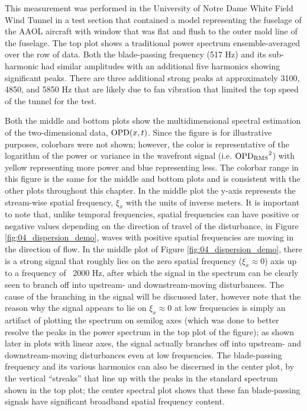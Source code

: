 This measurement was performed in the University of Notre Dame White Field Wind Tunnel in a test section that contained a model representing the fuselage of the AAOL aircraft \cite{Jumper-2013-8KtN3pue} with window that was flat and flush to the outer mold line of the fuselage.
The top plot shows a traditional power spectrum ensemble-averaged over the row of data.
Both the blade-passing frequency (517 Hz) and its sub-harmonic had similar amplitudes  with an additional five harmonics showing significant peaks.
There are three additional strong peaks at approximately 3100, 4850, and 5850 Hz that are likely due to fan vibration that limited the top speed of the tunnel for the test.

Both the middle and bottom plots show the multidimensional spectral estimation of the two-dimensional data, $\operatorname{OPD}(x,t)$.
Since the figure is for illustrative purposes, colorbars were not shown; however, the color is representative of the logarithm of the power or variance in the wavefront signal (i.e. $\operatorname{OPD_{RMS}}^2$) with yellow representing more power and blue representing less.
The colorbar range in this figure is the same for the middle and bottom plots and is consistent with the other plots throughout this chapter.
In the middle plot the y-axis represents the stream-wise spatial frequency, $\xi_x$ with the units of inverse meters.
It is important to note that, unlike temporal frequencies, spatial frequencies can have positive or negative values depending on the direction of travel of the disturbance,
in Figure \ref{fig:04_dispersion_demo}, waves with positive spatial frequencies are moving in the direction of flow.
In the middle plot of Figure \ref{fig:04_dispersion_demo}, there is a strong signal that roughly lies on the zero spatial frequency ($\xi_x\approx0$) axis up to a frequency of ~2000 Hz, after which the signal in the spectrum can be clearly seen to branch off into upstream- and downstream-moving disturbances.
The cause of the branching in the signal will be discussed later, however note that the reason why the signal appears to lie on $\xi_x\approx0$ at low frequencies is simply an artifact of plotting the spectrum on semilog axes (which was done to better resolve the peaks in the power spectrum in the top plot of the figure); as shown later in plots with linear axes, the signal actually branches off into upstream- and downstream-moving disturbances even at low frequencies.
The blade-passing frequency and its various harmonics can also be discerned in the center plot, by the vertical ``streaks'' that line up  with the peaks in the standard spectrum shown in the top plot; the center spectral plot shows that these fan blade-passing signals have significant broadband spatial frequency content.
